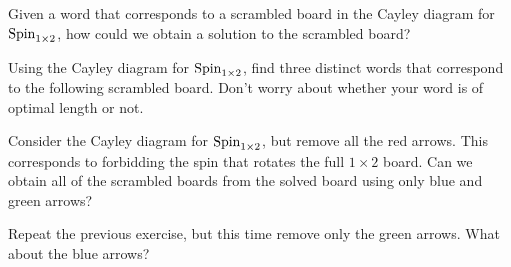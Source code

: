 \begin{exercise}
Given a word that corresponds to a scrambled board in the Cayley diagram for $\operatorname{Spin}_{1\times 2}$, how could we obtain a solution to the scrambled board?
\end{exercise}

\begin{exercise}
Using the Cayley diagram for $\operatorname{Spin}_{1\times 2}$, find three distinct words that correspond to the following scrambled board.  Don't worry about whether your word is of optimal length or not.

\begin{center}
\end{center}
\end{exercise}

\begin{exercise}
Consider the Cayley diagram for $\operatorname{Spin}_{1\times 2}$, but remove all the red arrows.  This corresponds to forbidding the spin that rotates the full $1\times 2$ board.  Can we obtain all of the scrambled boards from the solved board using only blue and green arrows?
\end{exercise}

\begin{exercise}
Repeat the previous exercise, but this time remove only the green arrows.  What about the blue arrows?
\end{exercise}